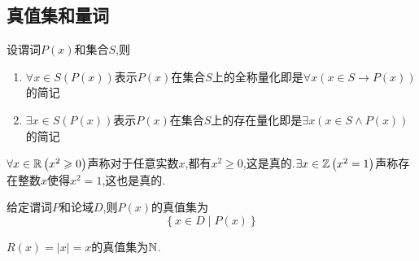 \subsection{真值集和量词}
\begin{formal}
    \begin{definition}[全称量化与存在量化]\label{def:全称量化与存在量化}
        设谓词$P(x)$和集合$S$,则\begin{enumerate}[label={\textup{(\arabic*)}}]
            \item $\forall x\in S\left(
                P\left(x\right)
            \right)$表示$P\left(x\right)$在集合$S$上的全称量化即是$\forall x\left(
                x\in S\rightarrow P\left(x\right)
            \right)$的简记
            \item $\exists x\in S\left(
                P\left(x\right)
            \right)$表示$P\left(x\right)$在集合$S$上的存在量化即是$\exists x\left(
                x\in S\wedge P\left(x\right)
            \right)$的简记
        \end{enumerate}
    \end{definition}
\end{formal}
\begin{brown}
\begin{example}
    $\forall x\in\mathbb{R}\left(
        x^2\geqslant0
    \right)$声称对于任意实数$x$,都有$x^2\geqslant0$,这是真的.$\exists x\in\mathbb{Z}\left(
        x^2=1
    \right)$声称存在整数$x$使得$x^2=1$,这也是真的.
\end{example}
\end{brown}
\begin{formal}
    \begin{definition}[真值集的定义]\label{def:真值集的定义}
        给定谓词$P$和论域$D$,则$P\left(x\right)$的真值集为\[
        \left\{
            x\in D\mid P\left(x\right)
        \right\}
        \]
    \end{definition}
\end{formal}
\begin{brown}
    \begin{example}
        $R\left(x\right)=\left|x\right|=x$的真值集为$\mathbb{N}$.
    \end{example}
\end{brown}
